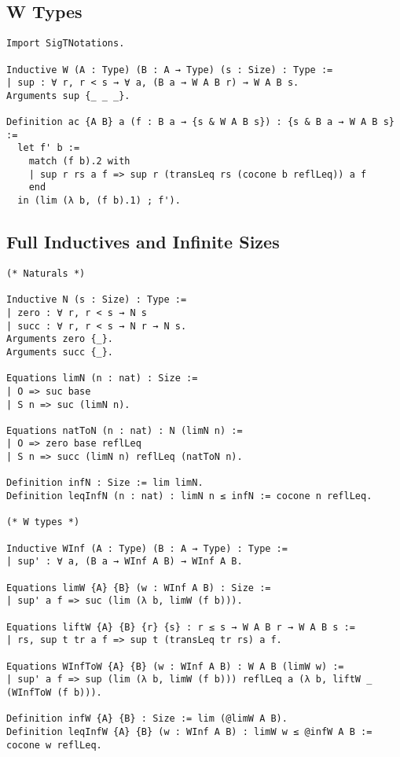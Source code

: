\subsection{W Types} \label{app:mechanization:coq:W}

\begin{singlespace}
\begin{verbatim}
Import SigTNotations.

Inductive W (A : Type) (B : A → Type) (s : Size) : Type :=
| sup : ∀ r, r < s → ∀ a, (B a → W A B r) → W A B s.
Arguments sup {_ _ _}.

Definition ac {A B} a (f : B a → {s & W A B s}) : {s & B a → W A B s} :=
  let f' b :=
    match (f b).2 with
    | sup r rs a f => sup r (transLeq rs (cocone b reflLeq)) a f
    end
  in (lim (λ b, (f b).1) ; f').
\end{verbatim}
\end{singlespace}

\subsection{Full Inductives and Infinite Sizes}

\begin{singlespace}
\begin{verbatim}
(* Naturals *)

Inductive N (s : Size) : Type :=
| zero : ∀ r, r < s → N s
| succ : ∀ r, r < s → N r → N s.
Arguments zero {_}.
Arguments succ {_}.

Equations limN (n : nat) : Size :=
| O => suc base
| S n => suc (limN n).

Equations natToN (n : nat) : N (limN n) :=
| O => zero base reflLeq
| S n => succ (limN n) reflLeq (natToN n).

Definition infN : Size := lim limN.
Definition leqInfN (n : nat) : limN n ≤ infN := cocone n reflLeq.

(* W types *)

Inductive WInf (A : Type) (B : A → Type) : Type :=
| sup' : ∀ a, (B a → WInf A B) → WInf A B.

Equations limW {A} {B} (w : WInf A B) : Size :=
| sup' a f => suc (lim (λ b, limW (f b))).

Equations liftW {A} {B} {r} {s} : r ≤ s → W A B r → W A B s :=
| rs, sup t tr a f => sup t (transLeq tr rs) a f.

Equations WInfToW {A} {B} (w : WInf A B) : W A B (limW w) :=
| sup' a f => sup (lim (λ b, limW (f b))) reflLeq a (λ b, liftW _ (WInfToW (f b))).

Definition infW {A} {B} : Size := lim (@limW A B).
Definition leqInfW {A} {B} (w : WInf A B) : limW w ≤ @infW A B := cocone w reflLeq.
\end{verbatim}
\end{singlespace}

